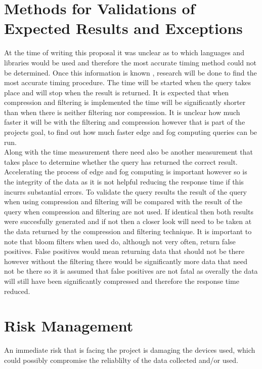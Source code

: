 \documentclass[11pt,journal, a4paper]{IEEEtran}
\begin{document}
\section{Methods for Validations of Expected Results and Exceptions}
\noindent
At the time of writing this proposal it was unclear as to which languages and libraries would be used and therefore the most accurate timing method could not be determined. Once this information is known , research will be done to find the most accurate timing procedure. The time will be started when the query takes place and will stop when the result is returned. It is expected that when compression and filtering is implemented the time will be significantly shorter than when there is neither filtering nor compression. It is unclear how much faster it will be with the filtering and compression however that is part of the projects goal, to find out how much faster edge and fog computing queries can be run. \\

\noindent
Along with the time measurement there need also be another measurement that takes place to determine whether the query has returned the correct result. Accelerating the process of edge and fog computing is important however so is the integrity of the data as it is not helpful reducing the response time if this incurrs substantial errors. To validate the query results the result of the query when using compression and filtering will be compared with the result of the query when compression and filtering are not used. If identical then both results were succesfully generated and if not then a closer look will need to be taken at the data returned by the compression and filtering technique. It is important to note that bloom filters when used do, although not very often, return false positives. False positives would mean returning data that should not be there however without the filtering there would be significantly more data that need not be there so it is assumed that false positives are not fatal as overally the data will still have been significantly compressed and therefore the response time reduced.


\section{Risk Management}
\noindent
An immediate risk that is facing the project is damaging the devices used, which could possibly compromise the reliablilty of the data collected and/or used.\\
\end{document}
